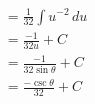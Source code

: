 \documentclass[preview]{standalone}
\begin{document}
\begin{align*}
&=\frac{1}{32} \int u^{-2} \, du \\ &=\frac{-1}{32u}+C \\ &=\frac{-1}{32\sin\theta}+C \\ &=\frac{-\csc\theta}{32}+C
\end{align*}
\end{document}
